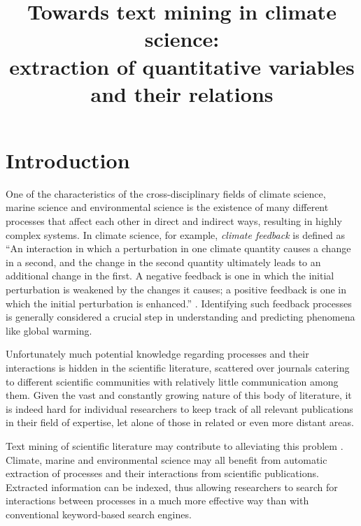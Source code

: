 \documentclass[10pt, a4paper]{article}
\title{Towards text mining in climate science:\\
extraction of quantitative variables and their relations}
\begin{document}
\maketitleabstract

\section{Introduction}

One of the characteristics of the cross-disciplinary fields of climate science, marine science and environmental science is the existence of many different processes that affect each other in direct and indirect ways, resulting in highly complex systems.
In climate science, for example, \emph{climate feedback} is defined as ``An interaction in which a perturbation in one climate quantity causes a change in a second, and the change in the
second quantity ultimately leads to an additional change in the first. 
A negative feedback is one in which the initial perturbation is weakened
by the changes it causes; a positive feedback is one in which the initial
perturbation is enhanced.'' \cite{stocker2013climate}.
Identifying such feedback processes is generally considered a crucial step in understanding and predicting phenomena like global warming.

Unfortunately much potential knowledge regarding processes and their interactions is hidden in the scientific literature, scattered over journals catering to different scientific communities with relatively little communication among them.
Given the vast and constantly growing nature of this body of literature, it is indeed hard for individual researchers to keep track of all relevant publications in their field of expertise, let alone of those in related or even more distant areas.   

Text mining of scientific literature may contribute to alleviating this problem \cite{Etzioni2011Search}.
Climate, marine and environmental science may all benefit from automatic extraction of processes and their interactions from scientific publications.
Extracted information can be indexed, thus allowing researchers to search for interactions between processes in a much more effective way than with conventional keyword-based search engines.
\end{document}
